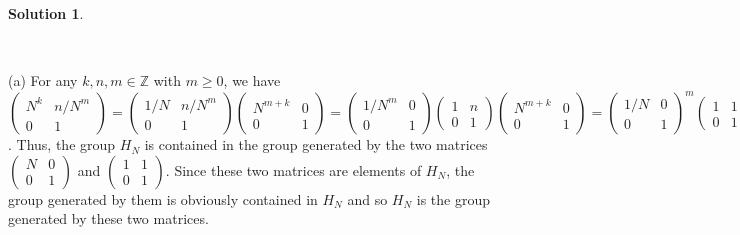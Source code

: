 \documentclass[10pt]{article}
\newcommand{\ZZ}{\mathbb Z}
\theoremstyle{Theorem}
\theoremstyle{definition}
\newtheorem{sol}{Solution}
\theoremstyle{remark}
\theoremstyle{custom}
\begin{document}
\begin{sol}
\begin{description} ~
\item{(a)} For any $k,n,m\in \ZZ$ with $m\geq 0$, we have 
$(\begin{smallmatrix}N^k&n/N^m\\0&1\end{smallmatrix})=(\begin{smallmatrix}1/N&n/N^m\\0&1\end{smallmatrix})(\begin{smallmatrix}N^{m+k}&0\\0&1\end{smallmatrix})=(\begin{smallmatrix}1/N^m&0\\0&1\end{smallmatrix})(\begin{smallmatrix}1&n\\0&1\end{smallmatrix})(\begin{smallmatrix}N^{m+k}&0\\0&1\end{smallmatrix})=(\begin{smallmatrix}1/N&0\\0&1\end{smallmatrix})^m(\begin{smallmatrix}1&1\\0&1\end{smallmatrix})^n(\begin{smallmatrix}N&0\\0&1\end{smallmatrix})^{m+k}=(\begin{smallmatrix}N&0\\0&1\end{smallmatrix})^{-m}(\begin{smallmatrix}1&1\\0&1\end{smallmatrix})^n(\begin{smallmatrix}N&0\\0&1\end{smallmatrix})^{m+k}$. Thus, the group $H_N$ is contained in the group generated by the two matrices 
$(\begin{smallmatrix}N&0\\0&1\end{smallmatrix})$ and 
$(\begin{smallmatrix}1&1\\0&1\end{smallmatrix})$. Since these two matrices are elements of $H_N$, the group generated by them is obviously contained in $H_N$ and so $H_N$ is the group generated by these two matrices. 

\end{description}
\end{sol}
\end{document}
